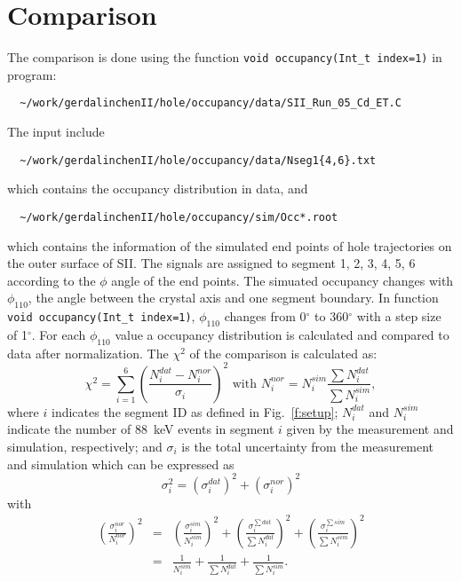 \documentclass[12pt, a4paper]{article}
\begin{document}
\section{Comparison}
\label{s:com}
The comparison is done using the function 
\lstinline!void occupancy(Int_t index=1)! in program:
\begin{lstlisting}
  ~/work/gerdalinchenII/hole/occupancy/data/SII_Run_05_Cd_ET.C
\end{lstlisting}
The input include
\begin{lstlisting}
  ~/work/gerdalinchenII/hole/occupancy/data/Nseg1{4,6}.txt
\end{lstlisting}
which contains the occupancy distribution in data, and
\begin{lstlisting}
  ~/work/gerdalinchenII/hole/occupancy/sim/Occ*.root
\end{lstlisting}
which contains the information of the simulated end points of hole
trajectories on the outer surface of SII. The signals are assigned to
segment 1, 2, 3, 4, 5, 6 according to the $\phi$ angle of the end
points. The simuated occupancy changes with $\phi_{110}$, the angle
between the crystal axis and one segment boundary. In function
\lstinline!void occupancy(Int_t index=1)!, $\phi_{110}$ changes from
0$^{\circ}$ to 360$^{\circ}$ with a step size of 1$^{\circ}$. For each
$\phi_{110}$ value a occupancy distribution is calculated and compared
to data after normalization. The $\chi^{2}$ of the comparison is
calculated as:
\begin{equation}
  \label{e:chi2}
  \chi^{2} = \sum_{i=1}^{6} \left( \frac{N^{dat}_{i} - N^{nor}_{i}} 
    {\sigma_{i}} \right)^{2} \text{   with   } N^{nor}_{i} = 
  N^{sim}_{i} \frac{\sum N^{dat}_{i}} {\sum N^{sim}_{i}} ,
\end{equation}
where $i$ indicates the segment ID as defined in Fig.~\ref{f:setup};
$N^{dat}_{i}$ and $N^{sim}_{i}$ indicate the number of 88~keV events
in segment $i$ given by the measurement and simulation, respectively;
and $\sigma_{i}$ is the total uncertainty from the measurement and
simulation which can be expressed as
\begin{equation}
  \label{e:sig}
  \sigma_{i}^{2} = (\sigma_{i}^{dat})^{2} + (\sigma_{i}^{nor})^{2}
\end{equation}
with
\begin{eqnarray}
  \label{e:nor}
  (\frac{\sigma_{i}^{nor}}{N_{i}^{nor}})^{2} &=& 
  (\frac{\sigma_{i}^{sim}}{N_{i}^{sim}})^{2} + 
  (\frac{\sigma_{i}^{\sum dat}}{\sum N_{i}^{dat}})^{2} +
  (\frac{\sigma_{i}^{\sum sim}}{\sum N_{i}^{sim}})^{2}\\
  &=& \frac{1}{N_{i}^{sim}} + \frac{1}{\sum N_{i}^{dat}} +
  \frac{1}{\sum N_{i}^{sim}}.
\end{eqnarray}
\end{document}
